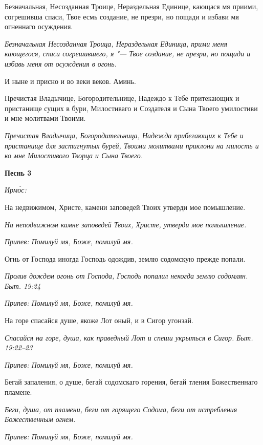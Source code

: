 Безначальная, Несозданная Троице, Нераздельная Единице, кающася мя приими, согрешивша спаси, Твое есмь создание, не презри, но пощади и избави мя огненнаго осуждения.


\itshape Безначальная Несозданная Троица, Нераздельная Единица, прими меня кающегося, спаси согрешившего, я "--- Твое создание, не презри, но пощади и избавь меня от осуждения в огонь.\normalfont{}


И ныне и присно и во веки веков. Аминь.


Пречистая Владычице, Богородительнице, Надеждо к Тебе притекающих и пристанище сущих в бури, Милостиваго и Создателя и Сына Твоего умилостиви и мне молитвами Твоими.


\itshape Пречистая Владычица, Богородительница, Надежда прибегающих к Тебе и пристанище для застигнутых бурей, Твоими молитвами приклони на милость и ко мне Милостивого Творца и Сына Твоего.\normalfont{}





\bfseries Песнь 3\normalfont{}


\itshape Ирмо́с:\normalfont{}


На недвижимом, Христе, камени заповедей Твоих утверди мое помышление.


\itshape На неподвижном камне заповедей Твоих, Христе, утверди мое помышление.\normalfont{}


\itshape Припев:\normalfont{} Помилуй мя, Боже, помилуй мя.


Огнь от Господа иногда Господь одождив, землю содомскую прежде попали.


\itshape Пролив дождем огонь от Господа, Господь попалил некогда землю содомлян. Быт. 19:24\normalfont{}


\itshape Припев:\normalfont{} Помилуй мя, Боже, помилуй мя.


На горе спасайся душе, якоже Лот оный, и в Сигор угонзай.


\itshape Спасайся на горе, душа, как праведный Лот и спеши укрыться в Сигор. Быт. 19:22–23\normalfont{}


\itshape Припев:\normalfont{} Помилуй мя, Боже, помилуй мя.


Бегай запаления, о душе, бегай содомскаго горения, бегай тления Божественнаго пламене.


\itshape Беги, душа, от пламени, беги от горящего Содома, беги от истребления Божественным огнем.\normalfont{}


\itshape Припев:\normalfont{} Помилуй мя, Боже, помилуй мя.


